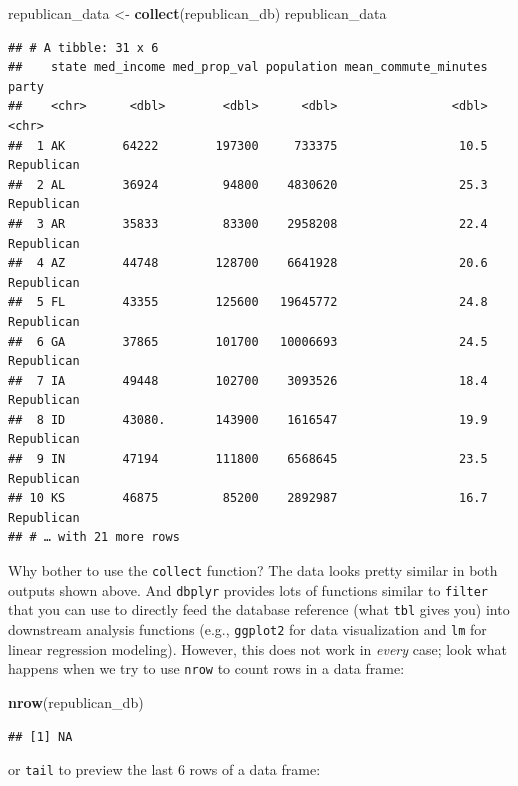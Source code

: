 \documentclass[
]{article}
\newenvironment{Shaded}{\begin{snugshade}}{\end{snugshade}}
\newcommand{\KeywordTok}[1]{\textcolor[rgb]{0.13,0.29,0.53}{\textbf{#1}}}
\newcommand{\NormalTok}[1]{#1}
\newcommand{\StringTok}[1]{\textcolor[rgb]{0.31,0.60,0.02}{#1}}
\begin{document}
\begin{Shaded}
\begin{Highlighting}[]
\NormalTok{republican\_data <{-}}\StringTok{ }\KeywordTok{collect}\NormalTok{(republican\_db)}
\NormalTok{republican\_data}
\end{Highlighting}
\end{Shaded}

\begin{verbatim}
## # A tibble: 31 x 6
##    state med_income med_prop_val population mean_commute_minutes party     
##    <chr>      <dbl>        <dbl>      <dbl>                <dbl> <chr>     
##  1 AK        64222        197300     733375                 10.5 Republican
##  2 AL        36924         94800    4830620                 25.3 Republican
##  3 AR        35833         83300    2958208                 22.4 Republican
##  4 AZ        44748        128700    6641928                 20.6 Republican
##  5 FL        43355        125600   19645772                 24.8 Republican
##  6 GA        37865        101700   10006693                 24.5 Republican
##  7 IA        49448        102700    3093526                 18.4 Republican
##  8 ID        43080.       143900    1616547                 19.9 Republican
##  9 IN        47194        111800    6568645                 23.5 Republican
## 10 KS        46875         85200    2892987                 16.7 Republican
## # … with 21 more rows
\end{verbatim}

Why bother to use the \texttt{collect} function? The data looks pretty
similar in both outputs shown above. And \texttt{dbplyr} provides lots
of functions similar to \texttt{filter} that you can use to directly
feed the database reference (what \texttt{tbl} gives you) into
downstream analysis functions (e.g., \texttt{ggplot2} for data
visualization and \texttt{lm} for linear regression modeling). However,
this does not work in \emph{every} case; look what happens when we try
to use \texttt{nrow} to count rows in a data frame:

\begin{Shaded}
\begin{Highlighting}[]
\KeywordTok{nrow}\NormalTok{(republican\_db)}
\end{Highlighting}
\end{Shaded}

\begin{verbatim}
## [1] NA
\end{verbatim}

or \texttt{tail} to preview the last 6 rows of a data frame:
\end{document}
